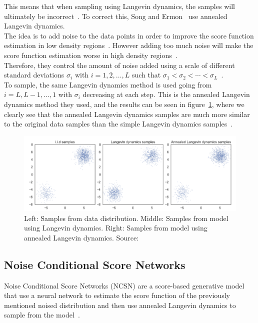 \documentclass{article}
\numberwithin{equation}{section}
\numberwithin{figure}{section}
\begin{document}
This means that when sampling using Langevin dynamics, the samples will ultimately be incorrect~\cite{song2020generative}.
To correct this, Song and Ermon~\cite{song2020generative} use annealed Langevin dynamics. \\
The idea is to add noise to the data points in order to improve the score function estimation in low density regions~\cite{songblog}. However adding too much noise will make the score function estimation worse in high density regions~\cite{songblog}. \\
Therefore, they control the amount of noise added using a scale of different standard deviations $\sigma_i$ with $i = 1, 2, \ldots, L$ such that $\sigma_1 < \sigma_2 < \cdots < \sigma_L$~\cite{songblog,song2020generative}. \\
To sample, the same Langevin dynamics method is used going from $i = L, L-1, \ldots, 1$ with $\sigma_i$ decreasing at each step. This is the annealed Langevin dynamics method they used, and the results can be seen in figure~\ref{fig:langevin_samples}, where we clearly see that the annealed Langevin dynamics samples are much more similar to the original data samples than the simple Langevin dynamics samples~\cite{songblog, song2020generative}. \\ 
\begin{figure}[h]
  \begin{center}
    \includegraphics[width=\textwidth]{images/langevin_samples.png}
    \caption{Left: Samples from data distribution. Middle: Samples from model using Langevin dynamics. Right: Samples from model using annealed Langevin dynamics. Source:~\cite{song2020generative}}
    \label{fig:langevin_samples}
  \end{center}
\end{figure}
\subsection{Noise Conditional Score Networks}
Noise Conditional Score Networks (NCSN) are a score-based generative model that use a neural network to estimate the score function of the previously mentioned noised distribution and then use annealed Langevin dynamics to sample from the model~\cite{song2020generative}.
\end{document}
